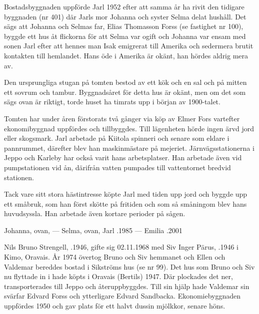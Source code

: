 Bostadsbyggnaden uppförde Jarl 1952 efter att samma år ha rivit den tidigare byggnaden (nr 401) där Jarls mor Johanna och syster Selma delat hushåll. Det sägs att Johanna och Selmas far, Elias Thomasson Forss (se fastighet nr 100), byggde ett hus åt flickorna för att Selma var ogift och Johanna var ensam med sonen Jarl efter att hennes man Isak emigrerat till Amerika och sedermera brutit kontakten till hemlandet. Hans öde i Amerika är okänt, han hördes aldrig mera av.


%


Den ursprungliga stugan på tomten bestod av ett kök och en sal och på mitten ett sovrum och tambur. Byggnadsåret för detta hus är okänt, men om det som sägs ovan är riktigt, torde huset ha timrats upp i början av 1900-talet.

Tomten har under åren förstorats två gånger via köp av Elmer Fors vartefter ekonomibyggnad uppfördes och tillbyggdes. Till lägenheten hörde ingen ärvd jord eller skogsmark. Jarl arbetade på Kiitola spinneri och senare som eldare i pannrummet, därefter blev han maskinmästare på mejeriet. Järnvägsstationerna i Jeppo och Karleby har också varit hans arbetsplatser. Han arbetade även vid pumpstationen vid ån, därifrån vatten pumpades till vattentornet bredvid stationen.

Tack vare sitt stora hästintresse köpte Jarl med tiden upp jord och byggde upp ett småbruk, som han först skötte på fritiden och som så småningom blev hans huvudsyssla. Han arbetade även kortare perioder på sågen.

Johanna, ovan,   ---  Selma, ovan, 
Jarl .1985  ---  Emilia .2001



%



%
Nils Bruno Strengell, .1946, gifte sig 02.11.1968 med Siv Inger Pärus, .1946 i Kimo, Oravais. År 1974 övertog Bruno och Siv hemmanet och Ellen och Valdemar bereddes bostad i Sikströms hus (se nr 99). Det hus som Bruno och Siv nu flyttade in i hade köpts i Oravais (Bertils) 1947. Där plockades det ner, transporterades till Jeppo och återuppbyggdes. Till sin hjälp hade Valdemar sin svärfar Edvard Forss och ytterligare Edvard Sandbacka. Ekonomiebyggnaden uppfördes 1950 och gav plats för ett halvt dussin mjölkkor, senare höns.

